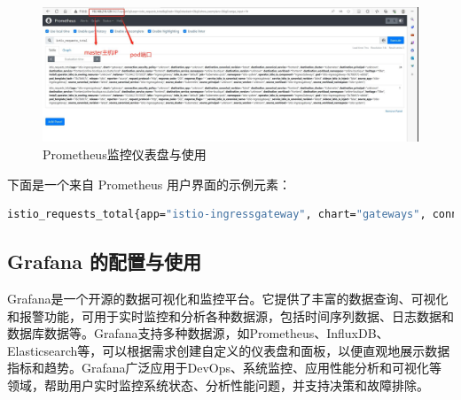 \begin{figure}[htb]
	\centering
	\includegraphics[width=1.0\textwidth]{figures/chapter2/prometheus.png}
	\caption{Prometheus监控仪表盘与使用}
	\label{fig:3-Prometheus监控仪表盘与使用}
\end{figure}
下面是一个来自 Prometheus 用户界面的示例元素：
\begin{lstlisting}[language=bash]
istio_requests_total{app="istio-ingressgateway", chart="gateways", connection_security_policy="unknown", destination_app="unknown", destination_canonical_revision="latest", destination_canonical_service="frontend", destination_cluster="Kubernetes", destination_principal="unknown", destination_service="frontend.online-boutique.svc.cluster.local", destination_service_name="frontend", destination_service_namespace="online-boutique", destination_version="unknown", destination_workload="frontend", destination_workload_namespace="online-boutique", heritage="Tiller", install_operator_istio_io_owning_resource="unknown", instance="10.244.2.15:15020", istio="ingressgateway", istio_io_rev="default", job="kubernetes-pods", namespace="istio-system", operator_istio_io_component="IngressGateways", pod="istio-ingressgateway-78c7bbfc7c-wbtdd", pod_template_hash="78c7bbfc7c", release="istio", reporter="source", request_protocol="http", response_code="200", response_flags="-", service_istio_io_canonical_name="istio-ingressgateway", service_istio_io_canonical_revision="latest", sidecar_istio_io_inject="false", source_app="istio-ingressgateway", source_canonical_revision="latest", source_canonical_service="istio-ingressgateway", source_cluster="Kubernetes", source_principal="unknown", source_version="unknown", source_workload="istio-ingressgateway", source_workload_namespace="istio-system"}
\end{lstlisting}
\subsection{Grafana 的配置与使用}
Grafana是一个开源的数据可视化和监控平台。它提供了丰富的数据查询、可视化和报警功能，可用于实时监控和分析各种数据源，包括时间序列数据、日志数据和数据库数据等。Grafana支持多种数据源，如Prometheus、InfluxDB、Elasticsearch等，可以根据需求创建自定义的仪表盘和面板，以便直观地展示数据指标和趋势。Grafana广泛应用于DevOps、系统监控、应用性能分析和可视化等领域，帮助用户实时监控系统状态、分析性能问题，并支持决策和故障排除。

